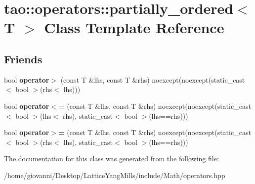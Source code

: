 \hypertarget{classtao_1_1operators_1_1partially__ordered_3_01T_01_4}{}\section{tao\+:\+:operators\+:\+:partially\+\_\+ordered$<$ T $>$ Class Template Reference}
\label{classtao_1_1operators_1_1partially__ordered_3_01T_01_4}
\subsection*{Friends}
\begin{DoxyCompactItemize}
\item 
bool {\bfseries operator$>$} (const T \&lhs, const T \&rhs) noexcept(noexcept(static\+\_\+cast$<$ bool $>$(rhs$<$ lhs)))\hypertarget{classtao_1_1operators_1_1partially__ordered_3_01T_01_4_aa86cc8d7ef85b5972d338294623c4310}{}\label{classtao_1_1operators_1_1partially__ordered_3_01T_01_4_aa86cc8d7ef85b5972d338294623c4310}

\item 
bool {\bfseries operator$<$=} (const T \&lhs, const T \&rhs) noexcept(noexcept(static\+\_\+cast$<$ bool $>$(lhs$<$ rhs), static\+\_\+cast$<$ bool $>$(lhs==rhs)))\hypertarget{classtao_1_1operators_1_1partially__ordered_3_01T_01_4_a64ea0e3d4fcb8a9cb4ce818526015d60}{}\label{classtao_1_1operators_1_1partially__ordered_3_01T_01_4_a64ea0e3d4fcb8a9cb4ce818526015d60}

\item 
bool {\bfseries operator$>$=} (const T \&lhs, const T \&rhs) noexcept(noexcept(static\+\_\+cast$<$ bool $>$(rhs$<$ lhs), static\+\_\+cast$<$ bool $>$(lhs==rhs)))\hypertarget{classtao_1_1operators_1_1partially__ordered_3_01T_01_4_af667515742c0544d890e4dc9043d5ad3}{}\label{classtao_1_1operators_1_1partially__ordered_3_01T_01_4_af667515742c0544d890e4dc9043d5ad3}

\end{DoxyCompactItemize}


The documentation for this class was generated from the following file\+:\begin{DoxyCompactItemize}
\item 
/home/giovanni/\+Desktop/\+Lattice\+Yang\+Mills/include/\+Math/operators.\+hpp\end{DoxyCompactItemize}
